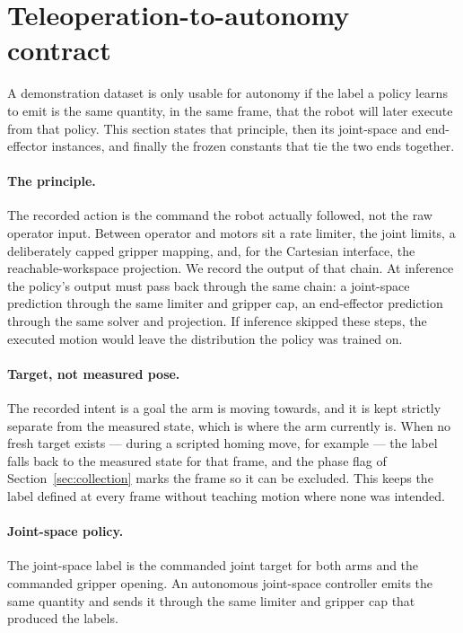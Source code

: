 \section{Teleoperation-to-autonomy contract}
\label{sec:contract}

A demonstration dataset is only usable for autonomy if the label a policy
learns to emit is the same quantity, in the same frame, that the robot will
later execute from that policy. This section states that principle, then
its joint-space and end-effector instances, and finally the frozen
constants that tie the two ends together.

\paragraph{The principle.} The recorded action is the command the robot
actually followed, not the raw operator input. Between operator and motors
sit a rate limiter, the joint limits, a deliberately capped gripper
mapping, and, for the Cartesian interface, the reachable-workspace
projection. We record the output of that chain. At inference the policy's
output must pass back through the same chain: a joint-space prediction
through the same limiter and gripper cap, an end-effector prediction
through the same solver and projection. If inference skipped these steps,
the executed motion would leave the distribution the policy was trained on.

\paragraph{Target, not measured pose.} The recorded intent is a goal the
arm is moving towards, and it is kept strictly separate from the measured
state, which is where the arm currently is. When no fresh target exists ---
during a scripted homing move, for example --- the label falls back to the
measured state for that frame, and the phase flag of
Section~\ref{sec:collection} marks the frame so it can be excluded. This
keeps the label defined at every frame without teaching motion where none
was intended.

\paragraph{Joint-space policy.} The joint-space label is the commanded
joint target for both arms and the commanded gripper opening. An autonomous
joint-space controller emits the same quantity and sends it through the
same limiter and gripper cap that produced the labels.


